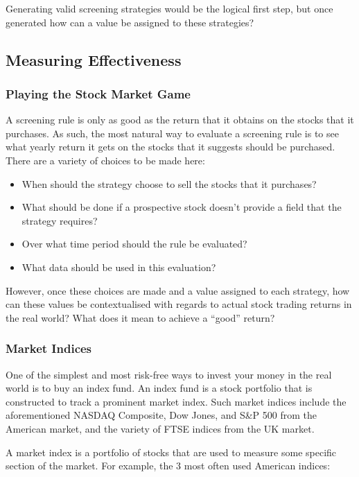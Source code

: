 Generating valid screening strategies would be the logical first step, but once generated how can a value be assigned to these strategies?

\subsection{Measuring Effectiveness}
\subsubsection{Playing the Stock Market Game}
A screening rule is only as good as the return that it obtains on the stocks that it purchases. As such, the most natural way to evaluate a screening rule is to see what yearly return it gets on the stocks that it suggests should be purchased. There are a variety of choices to be made here:
\begin{itemize}
    \item When should the strategy choose to sell the stocks that it purchases?
    \vspace{-2mm}
    \item What should be done if a prospective stock doesn't provide a field that the strategy requires?
    \vspace{-2mm}
    \item Over what time period should the rule be evaluated?
    \vspace{-2mm}
    \item What data should be used in this evaluation?
\end{itemize}

However, once these choices are made and a value assigned to each strategy, how can these values be contextualised with regards to actual stock trading returns in the real world? What does it mean to achieve a ``good'' return?

\subsubsection{Market Indices}
One of the simplest and most risk-free ways to invest your money in the real world is to buy an index fund. An index fund is a stock portfolio that is constructed to track a prominent market index. Such market indices include the aforementioned NASDAQ Composite, Dow Jones, and S\&P 500 from the American market, and the variety of FTSE indices from the UK market. \newline

A market index is a portfolio of stocks that are used to measure some specific section of the market. For example, the 3 most often used American indices: 

